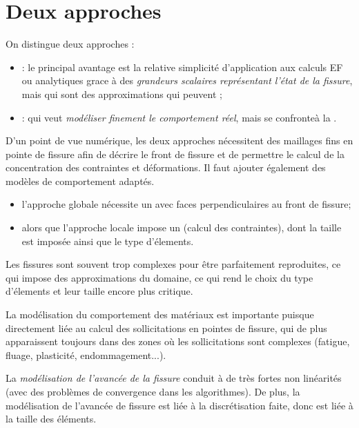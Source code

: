\medskip
\section{Deux approches}

On distingue deux approches :
\begin{itemize}
   \item {}: le principal avantage est la relative simplicité d'application 
	aux calculs EF ou analytiques grace à des \emph{grandeurs scalaires représentant l'état de 
	la fissure}, mais qui sont des approximations qui peuvent ;
   \item {}: qui veut \emph{modéliser finement le comportement réel}, 
	mais se confronteà la .
\end{itemize}

\medskip
D'un point de vue numérique, les deux approches nécessitent des maillages fins en pointe de
fissure afin de décrire le front de fissure et de permettre le calcul de la concentration des contraintes
et déformations.
Il faut ajouter également des modèles de comportement adaptés.
\begin{itemize}
   \item l'approche globale nécessite un  avec faces perpendiculaires 
	au front de fissure;
   \item alors que l'approche locale impose un  (calcul des contraintes), dont la 
	taille est imposée ainsi que le type d'élements.
\end{itemize}

\medskip
Les fissures sont souvent trop complexes pour être parfaitement reproduites, ce qui impose
des approximations du domaine, ce qui rend le choix du type d'élements et leur taille encore
plus critique.

La modélisation du comportement des matériaux est importante puisque directement
liée au calcul des sollicitations en pointes de fissure, qui de plus apparaissent toujours dans
des zones où les sollicitations sont complexes (fatigue, fluage, plasticité, endommagement...).

La \emph{modélisation de l'avancée de la fissure} conduit à de très fortes non linéarités
(avec des problèmes de convergence dans les algorithmes).
De plus, la modélisation de l'avancée de fissure est liée à la discrétisation faite, donc est
liée à la taille des éléments.

